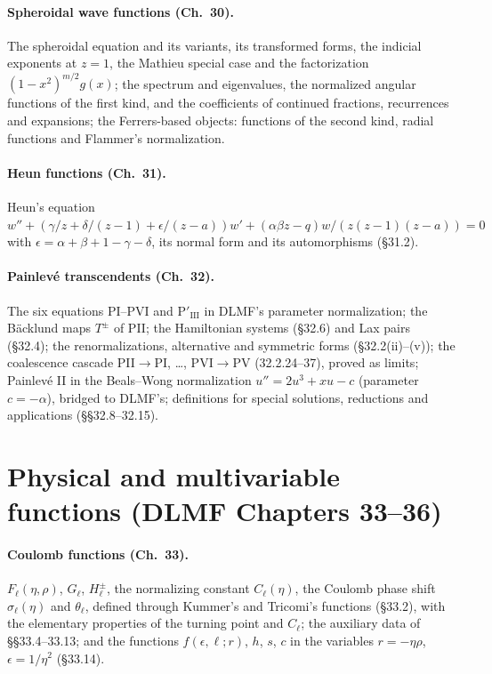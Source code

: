 \documentclass[11pt,a4paper]{article}
\begin{document}
\paragraph{Spheroidal wave functions (Ch.~30).} The spheroidal equation and its variants, its
transformed forms, the indicial exponents at $z=1$, the Mathieu special case and the factorization
$(1-x^2)^{m/2}g(x)$; the spectrum and eigenvalues, the normalized angular functions of the first
kind, and the coefficients of continued fractions, recurrences and expansions; the Ferrers-based
objects: functions of the second kind, radial functions and Flammer's normalization.

\paragraph{Heun functions (Ch.~31).} Heun's equation
$w''+(\gamma/z+\delta/(z-1)+\epsilon/(z-a))w'+(\alpha\beta z-q)w/(z(z-1)(z-a))=0$ with
$\epsilon=\alpha+\beta+1-\gamma-\delta$, its normal form and its automorphisms (\S31.2).

\paragraph{Painlev\'e transcendents (Ch.~32).} The six equations PI--PVI and $\mathrm P'_{\mathrm{III}}$
in DLMF's parameter normalization; the B\"acklund maps $T^\pm$ of PII; the Hamiltonian systems
(\S32.6) and Lax pairs (\S32.4); the renormalizations, alternative and symmetric forms
(\S32.2(ii)--(v)); the coalescence cascade PII$\to$PI, \dots, PVI$\to$PV (32.2.24--37), proved as
limits; Painlev\'e II in the Beals--Wong normalization $u''=2u^3+xu-c$ (parameter $c=-\alpha$),
bridged to DLMF's; definitions for special solutions, reductions and applications (\S\S32.8--32.15).

\section{Physical and multivariable functions (DLMF Chapters 33--36)}

\paragraph{Coulomb functions (Ch.~33).} $F_\ell(\eta,\rho)$, $G_\ell$, $H^\pm_\ell$, the
normalizing constant $C_\ell(\eta)$, the Coulomb phase shift $\sigma_\ell(\eta)$ and $\theta_\ell$,
defined through Kummer's and Tricomi's functions (\S33.2), with the elementary properties of the
turning point and $C_\ell$; the auxiliary data of \S\S33.4--33.13; and the functions
$f(\epsilon,\ell;r)$, $h$, $s$, $c$ in the variables $r=-\eta\rho$, $\epsilon=1/\eta^2$ (\S33.14).
\end{document}
